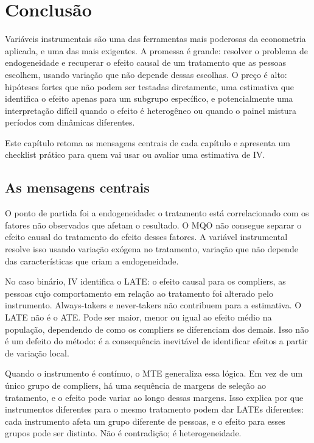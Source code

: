 
\chapter{Conclusão}
\label{cap:conclusao}

Variáveis instrumentais são uma das ferramentas mais poderosas da econometria aplicada, e uma das mais exigentes. A promessa é grande: resolver o problema de endogeneidade e recuperar o efeito causal de um tratamento que as pessoas escolhem, usando variação que não depende dessas escolhas. O preço é alto: hipóteses fortes que não podem ser testadas diretamente, uma estimativa que identifica o efeito apenas para um subgrupo específico, e potencialmente uma interpretação difícil quando o efeito é heterogêneo ou quando o painel mistura períodos com dinâmicas diferentes.

Este capítulo retoma as mensagens centrais de cada capítulo e apresenta um checklist prático para quem vai usar ou avaliar uma estimativa de IV.

\section{As mensagens centrais}
\label{sec:mensagens}

O ponto de partida foi a endogeneidade: o tratamento está correlacionado com os fatores não observados que afetam o resultado. O MQO não consegue separar o efeito causal do tratamento do efeito desses fatores. A variável instrumental resolve isso usando variação exógena no tratamento, variação que não depende das características que criam a endogeneidade.

No caso binário, IV identifica o LATE: o efeito causal para os compliers, as pessoas cujo comportamento em relação ao tratamento foi alterado pelo instrumento. Always-takers e never-takers não contribuem para a estimativa. O LATE não é o ATE. Pode ser maior, menor ou igual ao efeito médio na população, dependendo de como os compliers se diferenciam dos demais. Isso não é um defeito do método: é a consequência inevitável de identificar efeitos a partir de variação local.

Quando o instrumento é contínuo, o MTE generaliza essa lógica. Em vez de um único grupo de compliers, há uma sequência de margens de seleção ao tratamento, e o efeito pode variar ao longo dessas margens. Isso explica por que instrumentos diferentes para o mesmo tratamento podem dar LATEs diferentes: cada instrumento afeta um grupo diferente de pessoas, e o efeito para esses grupos pode ser distinto. Não é contradição; é heterogeneidade.

